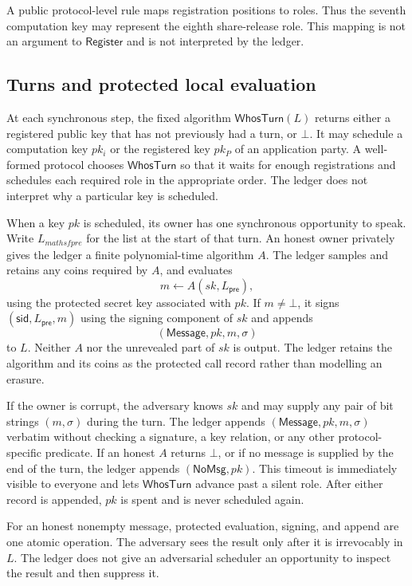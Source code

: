 A public protocol-level rule maps registration positions to roles. Thus the
seventh computation key may represent the eighth share-release role. This
mapping is not an argument to $\mathsf{Register}$ and is not interpreted by
the ledger.

\subsection{Turns and protected local evaluation}

At each synchronous step, the fixed algorithm $\mathsf{WhosTurn}(L)$ returns
either a registered public key that has not previously had a turn, or
$\bot$. It may schedule a computation key $pk_i$ or the registered key
$pk_P$ of an application party. A well-formed protocol chooses
$\mathsf{WhosTurn}$ so that it waits for enough registrations and schedules
each required role in the appropriate order. The ledger does not interpret
why a particular key is scheduled.

When a key $pk$ is scheduled, its owner has one synchronous opportunity to
speak. Write $L_{mathsf{pre}}$ for the list at the start of that turn. An
honest owner privately gives the ledger a finite polynomial-time algorithm
$A$. The ledger samples and retains any coins required by $A$, and evaluates
\[
  m\leftarrow A(sk,L_{\mathsf{pre}}),
\]
using the protected secret key associated with $pk$. If $m\neq\bot$, it
signs $(\mathsf{sid},L_{\mathsf{pre}},m)$ using the signing component of $sk$
and appends
\[
  (\mathsf{Message},pk,m,\sigma)
\]
to $L$. Neither $A$ nor the unrevealed part of $sk$ is output. The ledger
retains the algorithm and its coins as the protected call record rather than
modelling an erasure.

If the owner is corrupt, the adversary knows $sk$ and may supply any pair of
bit strings $(m,\sigma)$ during the turn. The ledger appends
$(\mathsf{Message},pk,m,\sigma)$ verbatim without checking a signature, a key
relation, or any other protocol-specific predicate. If an
honest $A$ returns $\bot$, or if no message is supplied by the end of the
turn, the ledger appends $(\mathsf{NoMsg},pk)$. This timeout is immediately
visible to everyone and lets $\mathsf{WhosTurn}$ advance past a silent role.
After either record is appended, $pk$ is spent and is never scheduled again.

For an honest nonempty message, protected evaluation, signing, and append are
one atomic operation. The adversary sees the result only after it is
irrevocably in $L$. The ledger does not give an adversarial scheduler an
opportunity to inspect the result and then suppress it.


